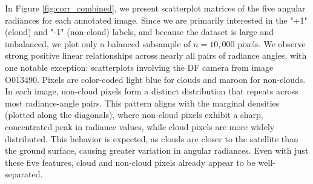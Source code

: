 \documentclass[10pt,letterpaper]{article}
\begin{document}
In Figure \ref{fig:corr_combined},  we present scatterplot matrices of the five angular radiances for each annotated image. Since we are primarily interested in the "+1" (cloud) and "-1" (non-cloud) labels, and because the dataset is large and imbalanced, we plot only a balanced subsample of $n=10,000$ pixels. We observe strong positive linear relationships across nearly all pairs of radiance angles, with one notable exception: scatterplots involving the DF camera from image O013490. Pixels are color-coded light blue for clouds and maroon for non-clouds. In each image, non-cloud pixels form a distinct distribution that repeats across most radiance-angle pairs. This pattern aligns with the marginal densities (plotted along the diagonals), where non-cloud pixels exhibit a sharp, concentrated peak in radiance values, while cloud pixels are more widely distributed. This behavior is expected, as clouds are closer to the satellite than the ground surface, causing greater variation in angular radiances. Even with just these five features, cloud and non-cloud pixels already appear to be well-separated.
\end{document}

